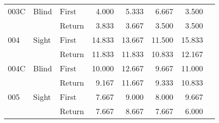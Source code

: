 \begin{table}[!htb]
\begin{tabular}{lllrrrrr}
003C & Blind & First &  4.000 &                                                 5.333 &                                                  6.667 &   3.500 \\
    &       & Return &  3.833 &                                                 3.667 &                                                  3.500 &   3.500 \\
004 & Sight & First & 14.833 &                                                13.667 &                                                 11.500 &  15.833 \\
    &       & Return & 11.833 &                                                11.833 &                                                 10.833 &  12.167 \\
004C & Blind & First & 10.000 &                                                12.667 &                                                  9.667 &  11.000 \\
    &       & Return &  9.167 &                                                11.667 &                                                  9.333 &  10.833 \\
005 & Sight & First &  7.667 &                                                 9.000 &                                                  8.000 &   9.667 \\
    &       & Return &  7.667 &                                                 8.667 &                                                  7.667 &   6.000 \\
\bottomrule
\end{tabular}
\end{table}

